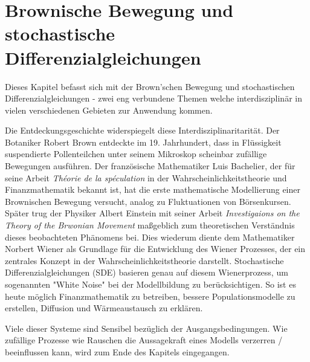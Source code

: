 %
%
%
%
\chapter{Brownische Bewegung und stochastische Differenzialgleichungen\label{chapter:brown}}
\begin{refsection}


Dieses Kapitel befasst sich mit der Brown'schen Bewegung und stochastischen Differenzialgleichungen - zwei eng verbundene Themen welche interdisziplinär in vielen verschiedenen Gebieten zur Anwendung kommen.

Die Entdeckungsgeschichte widerspiegelt diese Interdisziplinaritarität. Der Botaniker Robert Brown entdeckte im 19. Jahrhundert, dass in Flüssigkeit suspendierte Pollenteilchen unter seinem Mikroskop scheinbar zufällige Bewegungen ausführen. Der französische Mathematiker Luis Bachelier, der für seine Arbeit \glqq \textit{Théorie de la spéculation}\glqq{} in der Wahrscheinlichkeitstheorie und Finanzmathematik bekannt ist, hat die erste mathematische Modellierung einer Brownischen Bewegung versucht, analog zu Fluktuationen von Börsenkursen. Später trug der Physiker Albert Einstein mit seiner Arbeit \glqq \textit{Investigaions on the Theory of the Brwonian Movement}\glqq{} maßgeblich zum theoretischen Verständnis dieses beobachteten Phänomens bei. Dies wiederum diente dem Mathematiker Norbert Wiener als Grundlage für die Entwicklung des Wiener Prozesses, der ein zentrales Konzept in der Wahrscheinlichkeitstheorie darstellt. Stochastische Differenzialgleichungen (SDE) basieren genau auf diesem Wienerprozess, um sogenannten "White Noise"  bei der Modellbildung zu berücksichtigen. So ist es heute möglich Finanzmathematik zu betreiben, bessere Populationsmodelle zu erstellen, Diffusion und Wärmeaustausch zu erklären.


Viele dieser Systeme sind Sensibel bezüglich der Ausgangsbedingungen. Wie zufällige Prozesse wie Rauschen die Aussagekraft eines Modells verzerren / beeinflussen kann, wird zum Ende des Kapitels eingegangen.






%


\printbibliography[heading=subbibliography]
\end{refsection}
